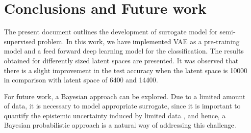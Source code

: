 \documentclass[sigconf, authorversion]{acmart}
\begin{document}
\section{Conclusions and Future work}
The present document outlines the development of surrogate model for semi-supervised problem. In this work, we have implemented VAE as a pre-training model and a feed forward deep learning model for the classification. The results obtained for differently sized latent spaces are presented. It was observed that there is a slight improvement in the  test accuracy when the latent space is 10000 in comparison with latent space of 6400 and 14400.

For future work, a Bayesian approach can be explored. Due to a limited amount of data, it is necessary to model appropriate surrogate, since it is important to quantify the epistemic uncertainty induced by limited data \cite{per}, \cite{Yinhao} and hence, a Bayesian probabilistic approach is a natural way of addressing this challenge.









\appendix
\end{document}
